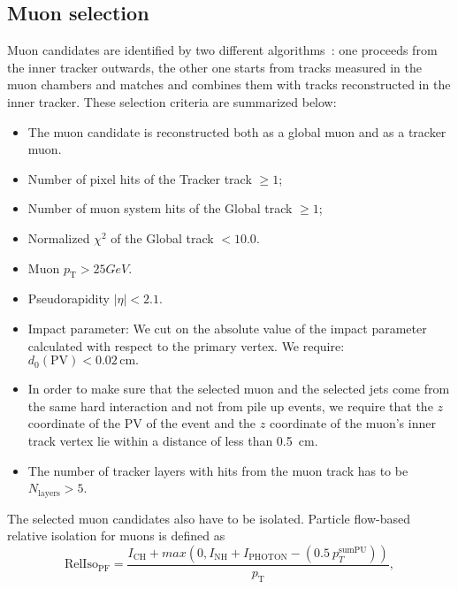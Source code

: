 \subsection{Muon selection}
\label{sec:muon_cuts}

Muon candidates are identified by two different
algorithms~\cite{MUONPAS}: one proceeds from the inner tracker outwards,
the other one starts from tracks measured in the muon chambers and matches
and combines them with tracks reconstructed in the inner tracker.
These selection criteria are summarized below:
\begin{itemize}
\item The muon candidate is reconstructed both as a global muon and
as a tracker muon.
\item Number of pixel hits of the Tracker track $\ge 1$;
\item Number of muon system hits of the Global track $\ge 1$;
\item Normalized $\chi^{2}$ of the Global track $< 10.0$.
\item Muon $p_{\mathrm{T}} > 25GeV$.%
\item Pseudorapidity $|\eta| < 2.1$.
\item Impact parameter: We cut on the absolute value of the impact
parameter calculated with respect to the primary vertex. We require:
$d_0(\mathrm{PV}) < 0.02\,\mathrm{cm}.$
\item In order to make sure that the selected muon and the selected
jets come from the same hard interaction and not from pile up events,
we require that the $z$ coordinate of the PV of the event and the $z$
coordinate of the muon's inner track vertex lie within a distance of
less than 0.5~cm.
\item The number of tracker layers with hits from the muon track has to be
$N_{\mathrm{layers}} > 5$.
\end{itemize}

The selected muon candidates also have to be isolated. Particle
flow-based relative isolation for muons is defined as
\begin{equation*}
\mathrm{RelIso_{\mathrm{PF}}} = \frac{I_{\mathrm{CH}}+max(0,I_{\mathrm{NH}}+I_{\mathrm{PHOTON}}-(0.5~{p}_{T}^\mathrm{sumPU}))}{p_\mathrm{T}},
\end{equation*}


